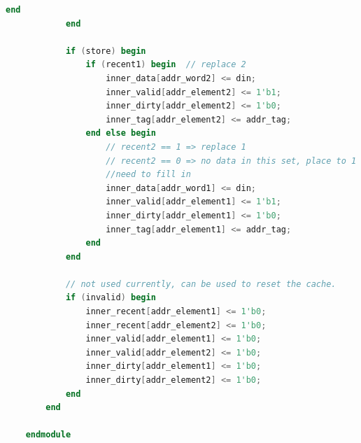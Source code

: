 \begin{lstlisting}[language = {verilog}]
                end
            end
    
            if (store) begin
                if (recent1) begin  // replace 2
                    inner_data[addr_word2] <= din;
                    inner_valid[addr_element2] <= 1'b1;
                    inner_dirty[addr_element2] <= 1'b0;
                    inner_tag[addr_element2] <= addr_tag;
                end else begin
                    // recent2 == 1 => replace 1
                    // recent2 == 0 => no data in this set, place to 1
                    //need to fill in
                    inner_data[addr_word1] <= din;
                    inner_valid[addr_element1] <= 1'b1;
                    inner_dirty[addr_element1] <= 1'b0;
                    inner_tag[addr_element1] <= addr_tag;
                end
            end
    
            // not used currently, can be used to reset the cache.
            if (invalid) begin
                inner_recent[addr_element1] <= 1'b0;
                inner_recent[addr_element2] <= 1'b0;
                inner_valid[addr_element1] <= 1'b0;
                inner_valid[addr_element2] <= 1'b0;
                inner_dirty[addr_element1] <= 1'b0;
                inner_dirty[addr_element2] <= 1'b0;
            end
        end
    
    endmodule
    
\end{lstlisting}